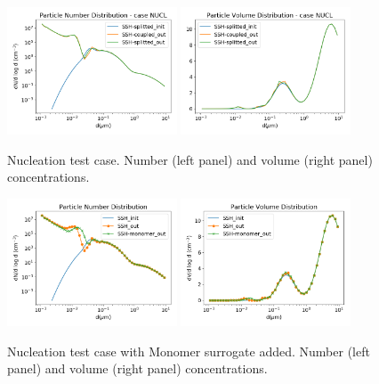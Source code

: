 \documentclass[a4paper,11pt]{article}
\begin{document}
\begin{figure}[H]
        \begin{center}
                \includegraphics[angle=0,width=0.45\textwidth]{../graph/figure_ref/dNdlogd_nucl.png}
                \includegraphics[angle=0,width=0.45\textwidth]{../graph/figure_ref/dVdlogd_nucl.png}
        \end{center}
\caption{Nucleation test case. Number (left panel) and volume (right panel) concentrations.}
\label{fig-nucl}
\end{figure}

\begin{figure}[H]
        \begin{center}
                \includegraphics[angle=0,width=0.45\textwidth]{../graph/figure_ref/dNdlogd_nucl_org.png}
                \includegraphics[angle=0,width=0.45\textwidth]{../graph/figure_ref/dVdlogd_nucl_org.png}
        \end{center}
\caption{Nucleation test case with Monomer surrogate added. Number (left panel) and volume (right panel) concentrations.}
\label{fig-nucl3}
\end{figure}
       
\end{document}
